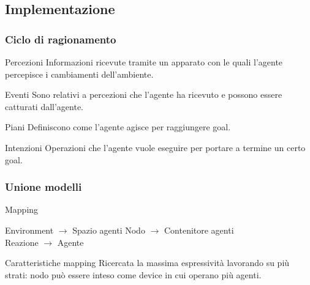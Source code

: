 \documentclass[handout]{beamer}\mode<presentation>{\usetheme{AMSCesenaBleu}}
\begin{document}
\subsection{Implementazione}
\begin{frame}
\frametitle{Ciclo di ragionamento}
\begin{block}{Percezioni}
Informazioni ricevute tramite un apparato con le quali l'agente percepisce i cambiamenti dell'ambiente.
\end{block}

\begin{block}{Eventi}
Sono relativi a percezioni che l'agente ha ricevuto e possono essere catturati dall'agente.
\end{block}

\begin{block}{Piani}
Definiscono come l'agente agisce per raggiungere goal.
\end{block}

\begin{block}{Intenzioni}
Operazioni che l'agente vuole eseguire per portare a termine un certo goal.
\end{block}
\end{frame}



\begin{frame}
\frametitle{Unione modelli}
\begin{block}{Mapping}
\begin{center}
\alert{Environment} $\rightarrow$ Spazio agenti \hspace{1.5cm} \alert{Nodo} $\rightarrow$ Contenitore agenti
\\\vspace{0.4cm}
\alert{Reazione} $\rightarrow$ Agente
\end{center}
\end{block}

\begin{block}{Caratteristiche mapping}
Ricercata la massima espressività lavorando su più strati: nodo può essere inteso come device in cui operano più agenti.
\end{block}
\end{frame}
\end{document}
